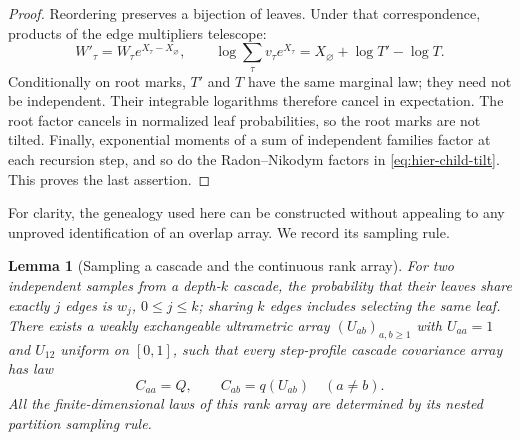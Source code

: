 \documentclass[11pt,a4paper]{article}
\numberwithin{equation}{section}
\newtheorem{lemma}[theorem]{Lemma}
\theoremstyle{definition}
\theoremstyle{remark}
\begin{document}
\begin{proof}
Reordering preserves a bijection of leaves.  Under that correspondence,
products of the edge multipliers telescope:
\[
 W'_\tau=W_\tau e^{X_\tau-X_\varnothing},\qquad
 \log\sum_\tau v_\tau e^{X_\tau}
   =X_\varnothing+\log T'-\log T.
\]
Conditionally on root marks, $T'$ and $T$ have the same marginal law; they
need not be independent.  Their integrable logarithms therefore cancel in
expectation.  The root factor cancels in normalized leaf probabilities, so
the root marks are not tilted.  Finally, exponential moments of a sum of
independent families factor at each recursion step, and so do the
Radon--Nikodym factors in \eqref{eq:hier-child-tilt}.  This proves the last
assertion.
\end{proof}

For clarity, the genealogy used here can be constructed without appealing
to any unproved identification of an overlap array.  We record its sampling
rule.

\begin{lemma}[Sampling a cascade and the continuous rank array]
\label{lem:hier-rank-array}
For two independent samples from a depth-$k$ cascade, the probability that
their leaves share exactly $j$ edges is $w_j$, $0\le j\le k$; sharing $k$
edges includes selecting the same leaf.  There exists a weakly exchangeable
ultrametric array $(U_{ab})_{a,b\ge1}$ with $U_{aa}=1$ and $U_{12}$ uniform
on $[0,1]$, such that every step-profile cascade covariance array has law
\[
 C_{aa}=Q,\qquad C_{ab}=q(U_{ab})\quad(a\ne b).
\]
All the finite-dimensional laws of this rank array are determined by its
nested partition sampling rule.
\end{lemma}
\end{document}
